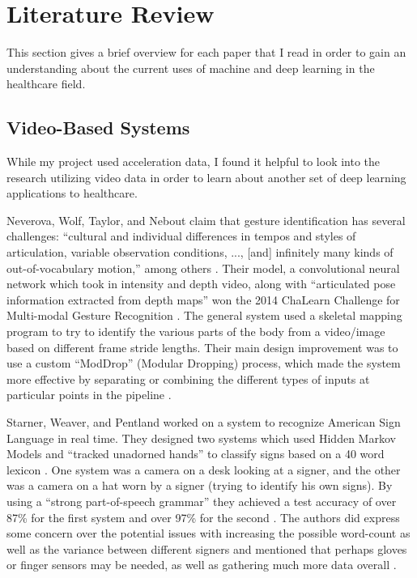 \documentclass[]{report}
\begin{document}
\section{Literature Review}

This section gives a brief overview for each paper that I read in order to gain an understanding about the current uses of machine and deep learning in the healthcare field.

\subsection{Video-Based Systems}

While my project used acceleration data, I found it helpful to look into the research utilizing video data in order to learn about another set of deep learning applications to healthcare.

Neverova, Wolf, Taylor, and Nebout claim that gesture identification has several challenges: ``cultural and individual differences in tempos and styles of articulation, variable observation conditions, ..., [and] infinitely many kinds of out-of-vocabulary motion,'' among others \cite{Neverova}. Their model, a convolutional neural network which took in intensity and depth video, along with ``articulated pose information extracted from depth maps'' won the 2014 ChaLearn Challenge for Multi-modal Gesture Recognition \cite{Neverova}. The general system used a skeletal mapping program to try to identify the various parts of the body from a video/image based on different frame stride lengths. Their main design improvement was to use a custom ``ModDrop'' (Modular Dropping) process, which made the system more effective by separating or combining the different types of inputs at particular points in the pipeline \cite{Neverova}. 

Starner, Weaver, and Pentland worked on a system to recognize American Sign Language in real time. They designed two systems which used Hidden Markov Models and ``tracked unadorned hands'' to classify signs based on a 40 word lexicon \cite{Starner98}. One system was a camera on a desk looking at a signer, and the other was a camera on a hat worn by a signer (trying to identify his own signs). By using a ``strong part-of-speech grammar'' they achieved a test accuracy of over 87\% for the first system and over 97\% for the second \cite{Starner98}. The authors did express some concern over the potential issues with increasing the possible word-count as well as the variance between different signers and mentioned that perhaps gloves or finger sensors may be needed, as well as gathering much more data overall \cite{Starner98}.
\end{document}
